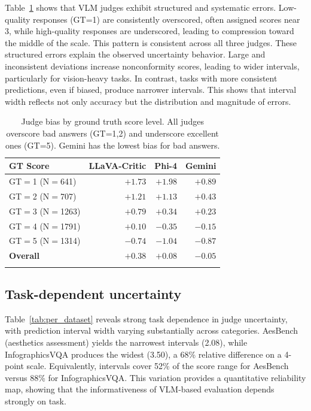 \documentclass{article}
\begin{document}
Table~\ref{tab:bias2} shows that VLM judges exhibit structured and systematic errors. Low-quality responses (GT=1) are consistently overscored, often assigned scores near 3, while high-quality responses are underscored, leading to compression toward the middle of the scale. This pattern is consistent across all three judges. These structured errors explain the observed uncertainty behavior. Large and inconsistent deviations increase nonconformity scores, leading to wider intervals, particularly for vision-heavy tasks. In contrast, tasks with more consistent predictions, even if biased, produce narrower intervals. This shows that interval width reflects not only accuracy but the distribution and magnitude of errors.

\begin{table}[t]
\centering
\caption{Judge bias by ground truth score level. All judges overscore bad answers (GT=1,2) and underscore excellent ones (GT=5). Gemini has the lowest bias for bad answers.}
\label{tab:bias2}
\small
\begin{tabular}{lrrr}
\toprule
\textbf{GT Score} & \textbf{LLaVA-Critic} & \textbf{Phi-4} & \textbf{Gemini} \\
\midrule
GT$=$1 (N$=$641) & $+1.73$ & $+1.98$ & $\mathbf{+0.89}$ \\
GT$=$2 (N$=$707) & $+1.21$ & $+1.13$ & $\mathbf{+0.43}$ \\
GT$=$3 (N$=$1263) & $+0.79$ & $+0.34$ & $\mathbf{+0.23}$ \\
GT$=$4 (N$=$1791) & $+0.10$ & $-0.35$ & $\mathbf{-0.15}$ \\
GT$=$5 (N$=$1314) & $-0.74$ & $-1.04$ & $\mathbf{-0.87}$ \\
\midrule
\textbf{Overall} & $+0.38$ & $+0.08$ & $\mathbf{-0.05}$ \\
\bottomrule\vspace{-15pt}
\end{tabular}
\end{table}

\subsection{Task-dependent uncertainty}
\label{sec:task_dependent}

Table~\ref{tab:per_dataset} reveals strong task dependence in judge uncertainty, with prediction interval width varying substantially across categories. AesBench (aesthetics assessment) yields the narrowest intervals (2.08), while InfographicsVQA produces the widest (3.50), a 68\% relative difference on a 4-point scale. Equivalently, intervals cover 52\% of the score range for AesBench versus 88\% for InfographicsVQA. This variation provides a quantitative reliability map, showing that the informativeness of VLM-based evaluation depends strongly on task.
\end{document}
